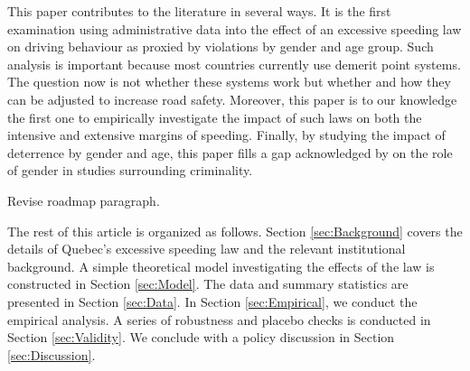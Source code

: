This paper contributes to the literature in several ways. 
It is the first examination using administrative data into the effect of 
an excessive speeding law on driving behaviour 
as proxied by violations by gender and age group. 
Such analysis is important because most countries currently use demerit point systems. 
The question now is not whether these systems work 
but whether and how they can be adjusted to increase road safety. 
Moreover, this paper is to our knowledge the first one to empirically investigate 
the impact of such laws on both the intensive and extensive margins of speeding. 
Finally, by studying the impact of deterrence by gender and age, 
this paper fills a gap acknowledged by 
\citet{freeman1999}
on the role of gender in studies surrounding criminality.

{\Large Revise roadmap paragraph.}

The rest of this article is organized as follows. 
Section \ref{sec:Background} covers the details of Quebec’s excessive speeding law 
and the relevant institutional background. 
A simple theoretical model investigating the effects of the law is constructed in Section \ref{sec:Model}. 
The data and summary statistics are presented in Section \ref{sec:Data}. 
In Section \ref{sec:Empirical}, we conduct the empirical analysis. 
A series of robustness and placebo checks is conducted in Section \ref{sec:Validity}. 
We conclude with a policy discussion in Section \ref{sec:Discussion}.

